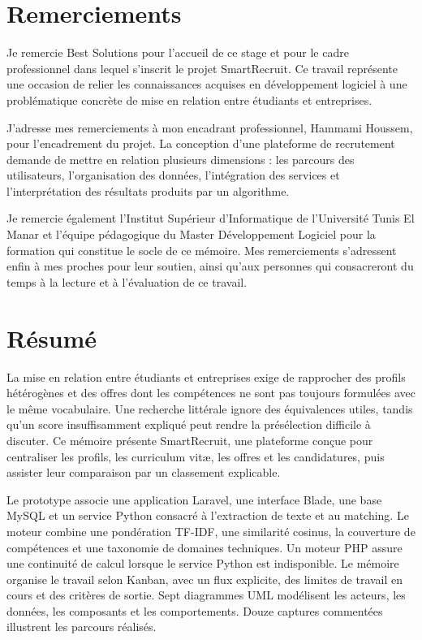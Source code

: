 \chapter*{Remerciements}
Je remercie Best Solutions pour l'accueil de ce stage et pour le cadre professionnel dans lequel s'inscrit le projet SmartRecruit. Ce travail représente une occasion de relier les connaissances acquises en développement logiciel à une problématique concrète de mise en relation entre étudiants et entreprises.

J'adresse mes remerciements à mon encadrant professionnel, Hammami Houssem, pour l'encadrement du projet. La conception d'une plateforme de recrutement demande de mettre en relation plusieurs dimensions : les parcours des utilisateurs, l'organisation des données, l'intégration des services et l'interprétation des résultats produits par un algorithme.

Je remercie également l'Institut Supérieur d'Informatique de l'Université Tunis El Manar et l'équipe pédagogique du Master Développement Logiciel pour la formation qui constitue le socle de ce mémoire. Mes remerciements s'adressent enfin à mes proches pour leur soutien, ainsi qu'aux personnes qui consacreront du temps à la lecture et à l'évaluation de ce travail.

\chapter*{Résumé}
La mise en relation entre étudiants et entreprises exige de rapprocher des profils hétérogènes et des offres dont les compétences ne sont pas toujours formulées avec le même vocabulaire. Une recherche littérale ignore des équivalences utiles, tandis qu'un score insuffisamment expliqué peut rendre la présélection difficile à discuter. Ce mémoire présente SmartRecruit, une plateforme conçue pour centraliser les profils, les curriculum vitæ, les offres et les candidatures, puis assister leur comparaison par un classement explicable.

Le prototype associe une application Laravel, une interface Blade, une base MySQL et un service Python consacré à l'extraction de texte et au matching. Le moteur combine une pondération TF-IDF, une similarité cosinus, la couverture de compétences et une taxonomie de domaines techniques. Un moteur PHP assure une continuité de calcul lorsque le service Python est indisponible. Le mémoire organise le travail selon Kanban, avec un flux explicite, des limites de travail en cours et des critères de sortie. Sept diagrammes UML modélisent les acteurs, les données, les composants et les comportements. Douze captures commentées illustrent les parcours réalisés.

